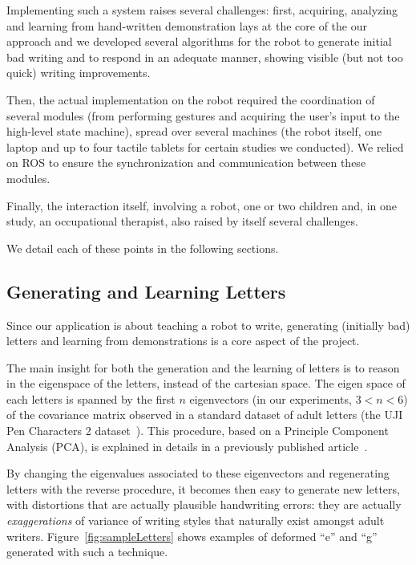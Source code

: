 \documentclass{article}
\begin{document}
Implementing such a system raises several challenges: first, acquiring,
analyzing and learning from hand-written demonstration lays at the core of the
our approach and we developed several algorithms for the robot to generate
initial bad writing and to respond in an adequate manner, showing visible (but
not too quick) writing improvements.

Then, the actual implementation on the robot required the coordination of
several modules (from performing gestures and acquiring the user's input to
the high-level state machine), spread over several machines (the robot itself,
one laptop and up to four tactile tablets for certain studies we conducted). We
relied on ROS to ensure the synchronization and communication between these
modules.

Finally, the interaction itself, involving a robot, one or two children and, in
one study, an occupational therapist, also raised by itself several challenges.

We detail each of these points in the following sections.

\subsection{Generating and Learning Letters}

Since our application is about teaching a robot to write, generating (initially
bad) letters and learning from demonstrations is a core aspect of the project.

The main insight for both the generation and the learning of letters is to
reason in the eigenspace of the letters, instead of the cartesian space. The
eigen space of each letters is spanned by the first $n$ eigenvectors (in our
experiments, $3 < n < 6$) of the covariance matrix observed in a standard
dataset of adult letters (the UJI Pen Characters 2 dataset~\cite{Llorens2008}).
This procedure, based on a Principle Component Analysis (PCA), is explained in
details in a previously published article~\cite{hood2015when}.

By changing the eigenvalues associated to these eigenvectors and regenerating
letters with the reverse procedure, it becomes then easy to generate new
letters, with distortions that are actually plausible handwriting errors: they
are actually \emph{exaggerations} of variance of writing styles that naturally
exist amongst adult writers.  Figure~\ref{fig:sampleLetters} shows examples of
deformed ``e'' and ``g'' generated with such a technique.
\end{document}

